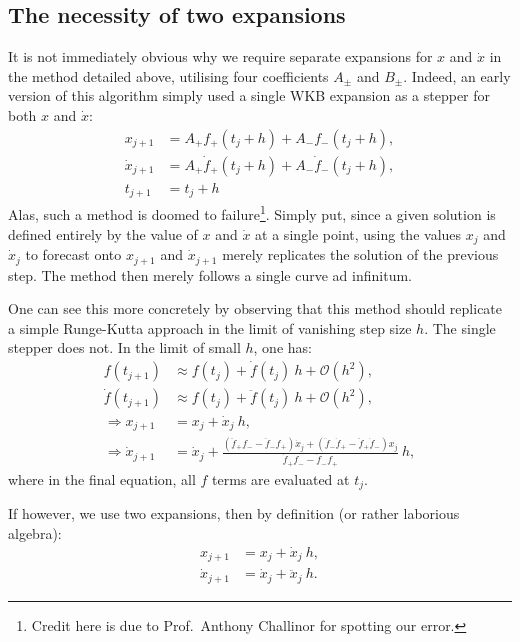 \subsection{The necessity of two expansions}
It is not immediately obvious why we require separate expansions for \(x\) and \(\dot{x}\) in the method detailed above, utilising four coefficients \(A_\pm\) and \(B_\pm\). Indeed, an early version of this algorithm simply used a single WKB expansion as a stepper for both \(x\) and \(\dot{x}\): 
\begin{align}
  x_{j+1} &= A_+ f_+(t_j + h) + A_- f_-(t_j + h) \tag{WRONG!},\\
  \dot{x}_{j+1} &= A_+ \dot{f}_+(t_j + h) + A_- \dot{f}_-(t_j + h) \tag{WRONG!},\\
  t_{j+1} &= t_j+h \tag{WRONG!}
\end{align}
Alas, such a method is doomed to failure\footnote{Credit here is due to Prof.\ Anthony Challinor for spotting our error.}. Simply put, since a given solution is defined entirely by the value of \(x\) and \(\dot{x}\) at a single point, using the values \(x_j\) and \(\dot{x}_{j}\) to forecast onto \(x_{j+1}\) and \(\dot{x}_{j+1}\) merely replicates the solution of the previous step.  The method then merely follows a single curve ad infinitum.

One can see this more concretely by observing that this method should replicate a simple Runge-Kutta approach in the limit of vanishing step size \(h\). The single stepper does not. In the limit of small \(h\), one has:
\begin{align}
    f(t_{j+1}) &\approx f(t_j) + \dot{f}(t_j) \: h +\mathcal{O}(h^2),  \tag{WRONG!} \\
    \dot{f}(t_{j+1}) &\approx f(t_j) + \ddot{f}(t_j) \: h +\mathcal{O}(h^2), \tag{WRONG!} \\
    \Rightarrow x_{j+1} &= x_j + \dot{x}_j \: h , \tag{WRONG!} \\
    \Rightarrow \dot{x}_{j+1} &= \dot{x}_j + 
    \frac{(\ddot{f}_+ f_- - \ddot{f}_- f_+)\dot{x}_j  +( \ddot{f}_- \dot{f}_+- \ddot{f}_+ \dot{f}_-)x_j}{\dot{f}_+ f_- - \dot{f}_- f_+}\: h
    , \tag{WRONG!}
\end{align}
where in the final equation, all \(f\) terms are evaluated at \(t_j\).

If however, we use two expansions, then by definition (or rather laborious algebra):
\begin{align}
    x_{j+1} &= x_j + \dot{x}_j \: h, \\
    \dot{x}_{j+1} &= \dot{x}_j + \ddot{x}_j \: h.
\end{align}



